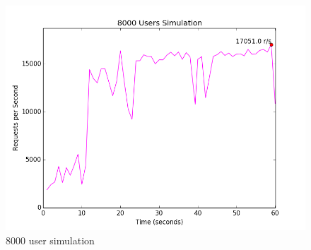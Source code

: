 \documentclass{article}
\begin{document}
\begin{figure}[H]
  \centering
  \includegraphics[scale=0.5]{diagrams/rps-8000.png}
  \caption{8000 user simulation}
\end{figure}
\end{document}
